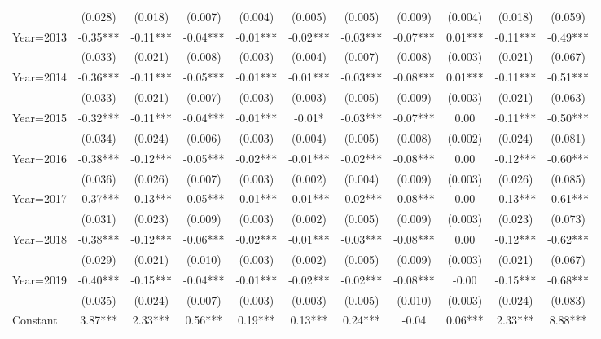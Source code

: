 {\begin{tabular}{l*{10}{c}}
                    &(0.028)   &(0.018)   &(0.007)   &(0.004)   &(0.005)   &(0.005)   &(0.009)   &(0.004)   &(0.018)   &(0.059)   \\
Year=2013           & -0.35***& -0.11***& -0.04***& -0.01***& -0.02***& -0.03***& -0.07***&  0.01***& -0.11***& -0.49***\\
                    &(0.033)   &(0.021)   &(0.008)   &(0.003)   &(0.004)   &(0.007)   &(0.008)   &(0.003)   &(0.021)   &(0.067)   \\
Year=2014           & -0.36***& -0.11***& -0.05***& -0.01***& -0.01***& -0.03***& -0.08***&  0.01***& -0.11***& -0.51***\\
                    &(0.033)   &(0.021)   &(0.007)   &(0.003)   &(0.003)   &(0.005)   &(0.009)   &(0.003)   &(0.021)   &(0.063)   \\
Year=2015           & -0.32***& -0.11***& -0.04***& -0.01***& -0.01*  & -0.03***& -0.07***&  0.00   & -0.11***& -0.50***\\
                    &(0.034)   &(0.024)   &(0.006)   &(0.003)   &(0.004)   &(0.005)   &(0.008)   &(0.002)   &(0.024)   &(0.081)   \\
Year=2016           & -0.38***& -0.12***& -0.05***& -0.02***& -0.01***& -0.02***& -0.08***&  0.00   & -0.12***& -0.60***\\
                    &(0.036)   &(0.026)   &(0.007)   &(0.003)   &(0.002)   &(0.004)   &(0.009)   &(0.003)   &(0.026)   &(0.085)   \\
Year=2017           & -0.37***& -0.13***& -0.05***& -0.01***& -0.01***& -0.02***& -0.08***&  0.00   & -0.13***& -0.61***\\
                    &(0.031)   &(0.023)   &(0.009)   &(0.003)   &(0.002)   &(0.005)   &(0.009)   &(0.003)   &(0.023)   &(0.073)   \\
Year=2018           & -0.38***& -0.12***& -0.06***& -0.02***& -0.01***& -0.03***& -0.08***&  0.00   & -0.12***& -0.62***\\
                    &(0.029)   &(0.021)   &(0.010)   &(0.003)   &(0.002)   &(0.005)   &(0.009)   &(0.003)   &(0.021)   &(0.067)   \\
Year=2019           & -0.40***& -0.15***& -0.04***& -0.01***& -0.02***& -0.02***& -0.08***& -0.00   & -0.15***& -0.68***\\
                    &(0.035)   &(0.024)   &(0.007)   &(0.003)   &(0.003)   &(0.005)   &(0.010)   &(0.003)   &(0.024)   &(0.083)   \\
Constant            &  3.87***&  2.33***&  0.56***&  0.19***&  0.13***&  0.24***& -0.04   &  0.06***&  2.33***&  8.88***\\

\end{tabular}}
